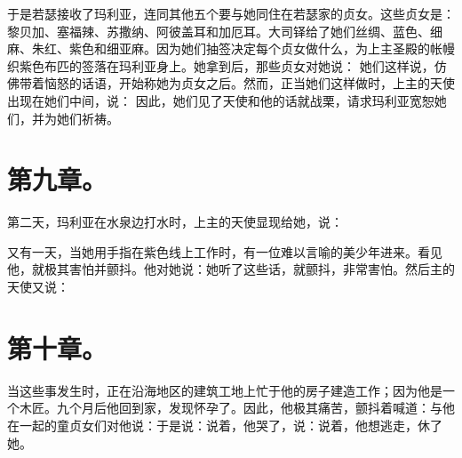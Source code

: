 于是若瑟接收了玛利亚，连同其他五个要与她同住在若瑟家的贞女。这些贞女是：黎贝加、塞福辣、苏撒纳、阿彼盖耳和加厄耳。大司铎给了她们丝绸、蓝色、细麻、朱红、紫色和细亚麻。因为她们抽签决定每个贞女做什么，为上主圣殿的帐幔织紫色布匹的签落在玛利亚身上。她拿到后，那些贞女对她说： 她们这样说，仿佛带着恼怒的话语，开始称她为贞女之后。然而，正当她们这样做时，上主的天使出现在她们中间，说： 因此，她们见了天使和他的话就战栗，请求玛利亚宽恕她们，并为她们祈祷。\par


\section{第九章。}

第二天，玛利亚在水泉边打水时，上主的天使显现给她，说：\par

又有一天，当她用手指在紫色线上工作时，有一位难以言喻的美少年进来。看见他，就极其害怕并颤抖。他对她说：她听了这些话，就颤抖，非常害怕。然后主的天使又说：\par


\section{第十章。}

当这些事发生时，正在沿海地区的建筑工地上忙于他的房子建造工作；因为他是一个木匠。九个月后他回到家，发现怀孕了。因此，他极其痛苦，颤抖着喊道：与他在一起的童贞女们对他说：于是说：说着，他哭了，说：说着，他想逃走，休了她。\par

